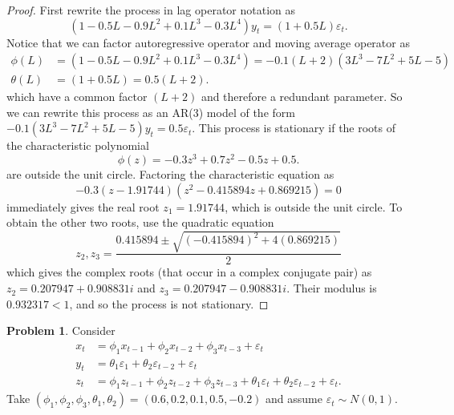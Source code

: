 \documentclass[oneside,reqno]{amsart}
\newcommand{\eps}{\varepsilon}
\theoremstyle{definition}
\newtheorem{prob}{Problem}
\begin{document}
\begin{proof}
First rewrite the process in lag operator notation as
\[
	(1-0.5L - 0.9 L^2 + 0.1 L^3 - 0.3 L^4)y_t = (1+0.5 L)\eps_t.
\]
Notice that we can factor autoregressive operator and moving average operator as 
\begin{align*}
	\phi(L) &= (1-0.5L - 0.9 L^2 + 0.1 L^3 - 0.3 L^4) = -0.1 (L + 2) (3L^3 - 7L^2 + 5L - 5) \\
	\theta(L) &= (1+0.5 L) = 0.5 (L+2).
\end{align*}
which have a common factor $(L+2)$ and therefore a redundant parameter. So we can rewrite this process as an AR(3) model of the form $-0.1(3L^3 - 7L^2 + 5L - 5)y_t = 0.5 \eps_t$. This process is stationary if the roots of the characteristic polynomial
\[
	\phi(z) = -0.3z^3 + 0.7z^2  - 0.5z + 0.5.
\]
are outside the unit circle. Factoring the characteristic equation as 
\[
	-0.3 (z - 1.91744) (z^2 - 0.415894 z + 0.869215) = 0
\]
immediately gives the real root $z_1 = 1.91744$, which is outside the unit circle. To obtain the other two roots, use the quadratic equation 
\[
	z_2, z_3 = \frac{0.415894 \pm \sqrt{(-0.415894)^2 + 4(0.869215)}}{2}
\] 
which gives the complex roots (that occur in a complex conjugate pair) as $z_2 = 0.207947 + 0.908831 i$ and $z_3= 0.207947 - 0.908831 i$. Their modulus is $0.932317 < 1$, and so the process is not stationary. 
\end{proof}

\begin{prob}
Consider 
\begin{align*}
	x_t &= \phi_1 x_{t-1} + \phi_2 x_{t-2} + \phi_3 x_{t-3} + \eps_t \\
	y_t &= \theta_1 \eps_1 + \theta_2 \eps_{t-2} + \eps_t \\
	z_t &= \phi_1 z_{t-1} + \phi_2 z_{t-2} + \phi_3 z_{t-3} + \theta_1 \eps_t + \theta_2 \eps_{t-2} + \eps_t.
\end{align*}
Take $(\phi_1, \phi_2, \phi_3, \theta_1, \theta_2) = (0.6, 0.2, 0.1, 0.5, -0.2)$ and assume $\eps_t \sim N(0,1)$.
\end{prob}
\end{document}
